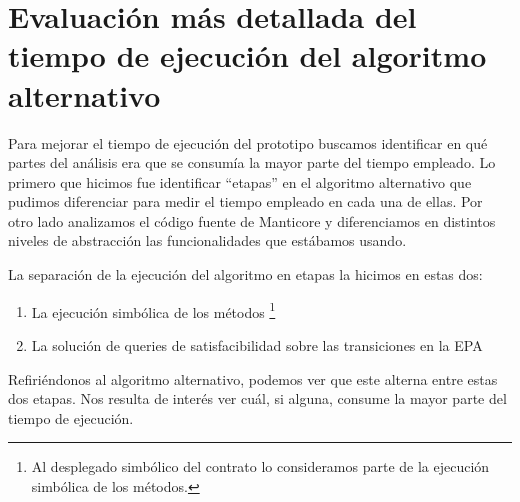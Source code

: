 \section{Evaluación más detallada del tiempo de ejecución del algoritmo alternativo}
Para mejorar el tiempo de ejecución del prototipo buscamos identificar en qué partes del análisis era que se consumía la mayor parte del tiempo empleado.
Lo primero que hicimos fue identificar ``etapas'' en el algoritmo alternativo que pudimos diferenciar para medir el tiempo empleado en cada una de ellas.
Por otro lado analizamos el código fuente de Manticore y diferenciamos en distintos niveles de abstracción las funcionalidades que estábamos usando.

La separación de la ejecución del algoritmo en etapas la hicimos en estas dos:
\begin{enumerate}
    \item La ejecución simbólica de los métodos \footnote{Al desplegado simbólico del contrato lo consideramos parte de la ejecución simbólica de los métodos.}
    \item La solución de queries de satisfacibilidad sobre las transiciones en la EPA
\end{enumerate}
Refiriéndonos al algoritmo alternativo, podemos ver que este alterna entre estas dos etapas.
Nos resulta de interés ver cuál, si alguna, consume la mayor parte del tiempo de ejecución.

